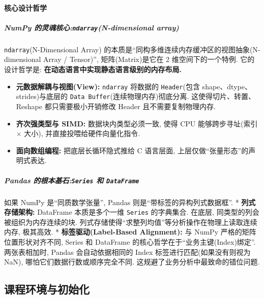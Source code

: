 \documentclass[11pt]{article}
\providecommand{\tightlist}{%
      \setlength{\itemsep}{0pt}\setlength{\parskip}{0pt}}
\begin{document}
    \paragraph{核心设计哲学}\label{ux6838ux5fc3ux8bbeux8ba1ux54f2ux5b66}

    \subparagraph{\texorpdfstring{NumPy
的灵魂核心:\texttt{ndarray}(N-dimensional
array)}{NumPy 的灵魂核心:ndarray(N-dimensional array)}}\label{numpy-ux7684ux7075ux9b42ux6838ux5fc3ndarrayn-dimensional-array}

    \texttt{ndarray}(N-Dimensional Array)
的本质是``同构多维连续内存缓冲区的视图抽象(N-dimensional Array /
Tensor)'', 矩阵(Matrix)是它在 2 维空间下的一个特例. 它的设计哲学是:
\textbf{在动态语言中实现静态语言级别的内存布局.}

\begin{itemize}
\tightlist
\item
  \textbf{元数据解耦与视图(View):} \texttt{ndarray} 将数据的
  \texttt{Header}(包含 shape、dtype、strides)与底层的
  \texttt{Data\ Buffer}(连续物理内存)彻底分离. 这使得切片、转置、Reshape
  都只需要极小开销修改 Header 且不需要复制物理内存.
\item
  \textbf{齐次强类型与 SIMD:} 数据块内类型必须一致, 使得 CPU
  能够跨步寻址(索引 × 大小), 并直接投喂给硬件向量化指令.
\item
  \textbf{面向数组编程:} 把底层长循环隐式推给 C 语言层面,
  上层仅做``张量形态''的声明式表达.
\end{itemize}

    \subparagraph{\texorpdfstring{Pandas 的根本基石:\texttt{Series} 和
\texttt{DataFrame}}{Pandas 的根本基石:Series 和 DataFrame}}\label{pandas-ux7684ux6839ux672cux57faux77f3series-ux548c-dataframe}

    如果 NumPy 是``同质数学张量'', Pandas 则是``带标签的异构列式数据框''. *
\textbf{列式存储架构:} DataFrame 本质是多个一维 \texttt{Series}
的字典集合. 在底层, 同类型的列会被组织为内存连续的块.
列式存储使得``求整列均值''等分析操作在物理上读取连续内存, 极其高效. *
\textbf{标签驱动(Label-Based Alignment):} 与 NumPy
严格的矩阵位置形状对齐不同, Series 和 DataFrame
的核心哲学在于``业务主键(Index)绑定''. 两张表相加时, Pandas
会自动依据相同的 Index 标签进行匹配(如果没有则视为 NaN),
哪怕它们数据行数或顺序完全不同. 这规避了业务分析中最致命的错位问题.

    \subsection{课程环境与初始化}\label{ux8bfeux7a0bux73afux5883ux4e0eux521dux59cbux5316}
\end{document}
